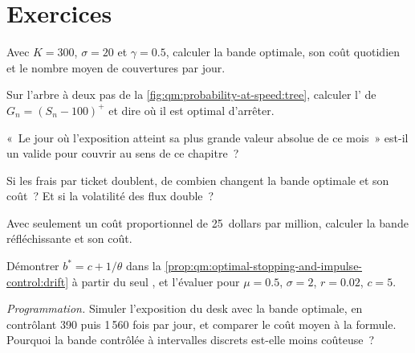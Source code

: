 \section{Exercices}

\begin{exercise}[$\star$]\label{exo:qm:optimal-stopping-and-impulse-control:1}
Avec $K = 300$, $\sigma = 20$ et $\gamma = 0.5$, calculer la bande optimale, son coût quotidien et le nombre moyen de couvertures par jour.
\end{exercise}

\begin{exercise}[$\star$]\label{exo:qm:optimal-stopping-and-impulse-control:2}
Sur l'arbre à deux pas de la \cref{fig:qm:probability-at-speed:tree}, calculer l' de $G_n = (S_n - 100)^+$ et dire où il
est optimal d'arrêter.
\end{exercise}

\begin{exercise}[$\star$]\label{exo:qm:optimal-stopping-and-impulse-control:3}
«~Le jour où l'exposition atteint sa plus grande valeur absolue de ce mois~» est-il un  valide pour couvrir au sens de ce chapitre~?
\end{exercise}

\begin{exercise}[$\star\star$]\label{exo:qm:optimal-stopping-and-impulse-control:4}
Si les frais par ticket doublent, de combien changent la bande optimale et son coût~? Et si la volatilité des flux double~?
\end{exercise}

\begin{exercise}[$\star\star$]\label{exo:qm:optimal-stopping-and-impulse-control:5}
Avec seulement un coût proportionnel de 25~dollars par million, calculer la bande réfléchissante et son coût.
\end{exercise}

\begin{exercise}[$\star\star$]\label{exo:qm:optimal-stopping-and-impulse-control:6}
Démontrer $b^* = c + 1/\theta$ dans la \cref{prop:qm:optimal-stopping-and-impulse-control:drift} à partir du seul , et l'évaluer pour
$\mu = 0.5$, $\sigma = 2$, $r = 0.02$, $c = 5$.
\end{exercise}

\begin{exercise}[$\star\star\star$]\label{exo:qm:optimal-stopping-and-impulse-control:7}
\emph{Programmation.} Simuler l'exposition du desk avec la bande optimale, en contrôlant 390 puis 1\,560 fois par jour, et comparer le coût moyen à la formule.
Pourquoi la bande contrôlée à intervalles discrets est-elle moins coûteuse~?
\end{exercise}

